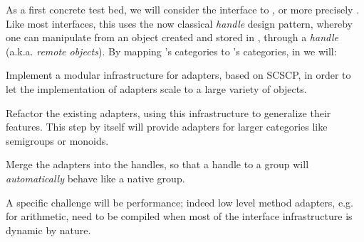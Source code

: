 \begin{workpackage}[id=component-architecture,wphases=0-48!.5,
  title=Component Architecture,lead=UV,
  PSRM=64,UVRM=8,SARM=16, USHRM=4, USORM=6, UORM=4, LLRM=22]
\begin{tasklist}
\begin{task}[title=Interfaces between systems,id=interface-systems,lead=PS,PM=22,partners={UV,UO,SA},wphases=0-36]
    As a first concrete test bed, we will consider the \Sage interface
    to \GAP, or more precisely \libGAP.  Like most \Sage interfaces,
    this uses the now classical \emph{handle} design pattern, whereby
    one can manipulate from \Sage an object created and stored in
    \GAP, through a \emph{handle} (a.k.a. \emph{remote objects}).  By
    mapping \GAP's categories to \Sage's categories, in
     we
    will:
    \begin{compactitem}
    \item Implement a modular infrastructure for adapters, based on
      SCSCP, in order to let the implementation of adapters scale to a
      large variety of objects.
    \item Refactor the existing adapters, using this infrastructure to
      generalize their features. This step by itself will provide
      adapters for larger categories like semigroups or monoids.
    \item Merge the adapters into the handles, so that a handle to a
      \GAP group will \emph{automatically} behave like a native \Sage
      group.
    \end{compactitem}
    A specific challenge will be performance; indeed low level method
    adapters, e.g. for arithmetic, need to be compiled when most of
    the interface infrastructure is dynamic by nature.

  \end{task}

  \begin{task}[title=Modularization and packaging,id=mod-packaging,lead=UV,PM=32,partners={PS,LL},wphases=0-48]




\end{task}
\end{tasklist}
\end{workpackage}
